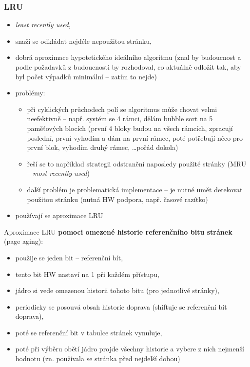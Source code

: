 \documentclass[a4paper, 11pt]{article}
\begin{document}
\subsubsection{LRU}
\begin{itemize}
    \item \emph{least recently used},
    \item snaží se odkládat nejdéle nepoužitou stránku,
    \item dobrá aproximace hypotetického ideálního algoritmu (znal by budoucnost a podle požadavků z budoucnosti by rozhodoval, co aktuálně odložit tak, aby byl počet výpadků minimální -- zatím to nejde)
    \item problémy:
    \begin{itemize}
        \item při cyklických průchodech polí se algoritmus může chovat velmi neefektivně -- např. systém se 4 rámci, dělám bubble sort na 5 paměťových blocích (první 4 bloky budou na všech rámcích, zpracují poslední, první vyhodím a dám na první rámec, poté potřebují něco pro první blok, vyhodím druhý rámec, \ldots pořád dokola)
    \item řeší se to například strategii odstranění naposledy použité stránky (MRU -- \emph{most recently used})
    \item další problém je problematická implementace -- je nutné umět detekovat použitou stránku (nutná HW podpora, např. časové razítko)
    \end{itemize}
    \item používají se aproximace LRU
\end{itemize}
 
Aproximace LRU \textbf{pomoci omezené historie referenčního bitu stránek} (page aging):
\begin{itemize}
    \item použije se jeden bit -- referenční bít,
    \item tento bit HW nastaví na 1 při každém přístupu,
    \item jádro si vede omezenou historii tohoto bitu (pro jednotlivé stránky),
    \item periodicky se posouvá obsah historie doprava (shiftuje se referenční bit doprava),
    \item poté se referenční bit v tabulce stránek vynuluje,
    \item poté při výběru obětí jádro projde všechny historie a vybere z nich nejmenší hodnotu (zn. používala se stránka před nejdelší dobou)
\end{itemize}
 
\end{document}

